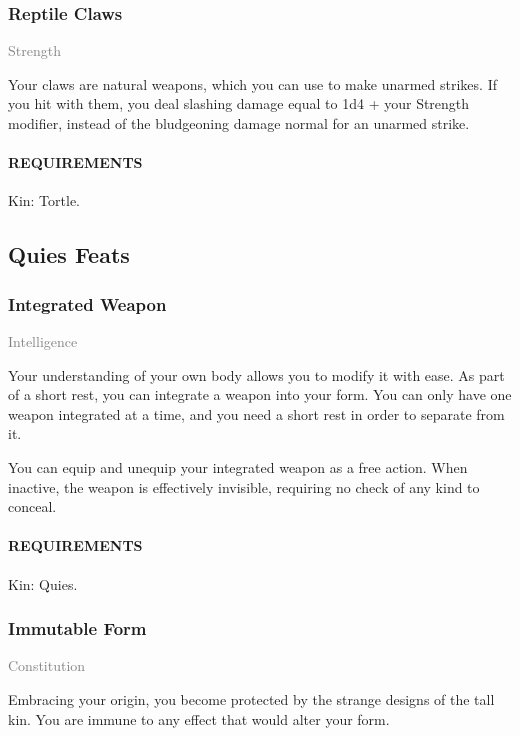     \subsubsection{Reptile Claws} \label{feat::reptileclaws}
    \small{\textcolor{gray}{Strength}}

    \normalsize
    Your claws are natural weapons, which you can use to make unarmed strikes.
    If you hit with them, you deal slashing damage equal to 1d4 + your Strength modifier, instead of the bludgeoning damage normal for an unarmed strike.
    \paragraph{REQUIREMENTS} Kin: Tortle.

\subsection*{Quies Feats}
    \subsubsection{Integrated Weapon} \label{feat::integratedweapon}
    \small{\textcolor{gray}{Intelligence}}

    \normalsize
    Your understanding of your own body allows you to modify it with ease.
    As part of a short rest, you can integrate a weapon into your form.
    You can only have one weapon integrated at a time, and you need a short rest in order to separate from it.

    You can equip and unequip your integrated weapon as a free action.
    When inactive, the weapon is effectively invisible, requiring no check of any kind to conceal.
    \paragraph{REQUIREMENTS} Kin: Quies.

    \subsubsection{Immutable Form} \label{feat::immutableform}
    \small{\textcolor{gray}{Constitution}}

    \normalsize
    Embracing your origin, you become protected by the strange designs of the tall kin.
    You are immune to any effect that would alter your form.
